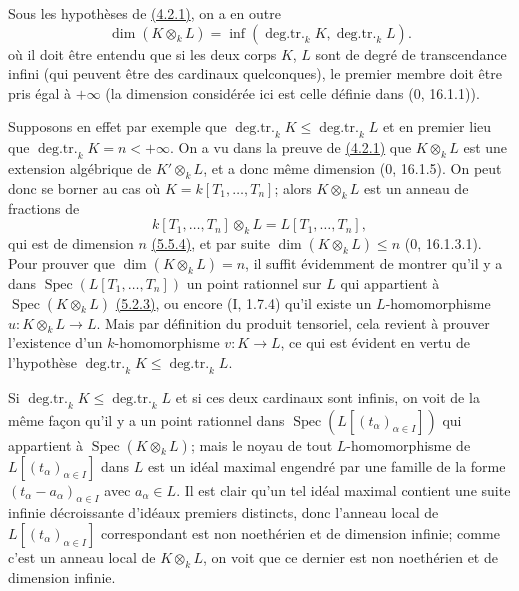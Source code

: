 \begin{remark}[4.2.1.4]
\label{IV.4.2.1.4}
Sous les hypothèses de {\hyperref[canon-index.ega4.c04.prop.4-2-1]{(4.2.1)}}, on a
en outre
\begin{equation}
 \dim(K\otimes_kL)=
 \inf(\operatorname{deg.tr.}_kK,\operatorname{deg.tr.}_kL).
 \label{IV.4.2.1.5}\tag{4.2.1.5}
\end{equation}
où il doit être entendu que si les deux corps $K$, $L$ sont de degré de
transcendance infini (qui peuvent être des cardinaux quelconques), le
premier membre doit être pris égal à $+\infty$ (la dimension considérée
ici est celle définie dans ($0$, 16.1.1)).

Supposons en effet par exemple que
$\operatorname{deg.tr.}_kK\leq\operatorname{deg.tr.}_kL$ et en premier
lieu que $\operatorname{deg.tr.}_kK=n<+\infty$. On a vu dans la preuve
de {\hyperref[canon-index.ega4.c04.prop.4-2-1]{(4.2.1)}} que $K\otimes_kL$ est une
extension algébrique de $K'\otimes_kL$, et a donc même dimension
($0$, 16.1.5). On peut donc se borner au cas où
$K=k[T_1,\ldots,T_n]$; alors $K\otimes_kL$ est un anneau de fractions
de
\[
 k[T_1,\ldots,T_n]\otimes_kL=L[T_1,\ldots,T_n],
\]
qui est de dimension $n$ {\hyperref[canon-index.ega4.c04.cor.5-5-4]{(5.5.4)}}, et
par suite $\dim(K\otimes_kL)\leq n$ ($0$, 16.1.3.1). Pour prouver que
$\dim(K\otimes_kL)=n$, il suffit évidemment de montrer qu'il y a dans
$\operatorname{Spec}(L[T_1,\ldots,T_n])$ un point rationnel sur $L$
qui appartient à $\operatorname{Spec}(K\otimes_kL)$
{\hyperref[canon-index.ega4.c04.cor.5-2-3]{(5.2.3)}}, ou encore (I, 1.7.4) qu'il
existe un $L$-homomorphisme $u:K\otimes_kL\to L$. Mais par définition
du produit tensoriel, cela revient à prouver l'existence d'un
$k$-homomorphisme $v:K\to L$, ce qui est évident en vertu de
l'hypothèse
$\operatorname{deg.tr.}_kK\leq\operatorname{deg.tr.}_kL$.

Si $\operatorname{deg.tr.}_kK\leq\operatorname{deg.tr.}_kL$ et si ces
deux cardinaux sont infinis, on voit de la même façon qu'il y a un point
rationnel dans $\operatorname{Spec}(L[(t_\alpha)_{\alpha\in I}])$ qui
appartient à $\operatorname{Spec}(K\otimes_kL)$; mais le noyau de tout
$L$-homomorphisme de $L[(t_\alpha)_{\alpha\in I}]$ dans $L$ est un
idéal maximal engendré par une famille de la forme
$(t_\alpha-a_\alpha)_{\alpha\in I}$ avec $a_\alpha\in L$. Il est clair
qu'un tel idéal maximal contient une suite infinie décroissante
d'idéaux premiers distincts, donc l'anneau local de
$L[(t_\alpha)_{\alpha\in I}]$ correspondant est non noethérien et de
dimension infinie; comme c'est un anneau local de $K\otimes_kL$, on
voit que ce dernier est non noethérien et de dimension infinie.
\end{remark}

